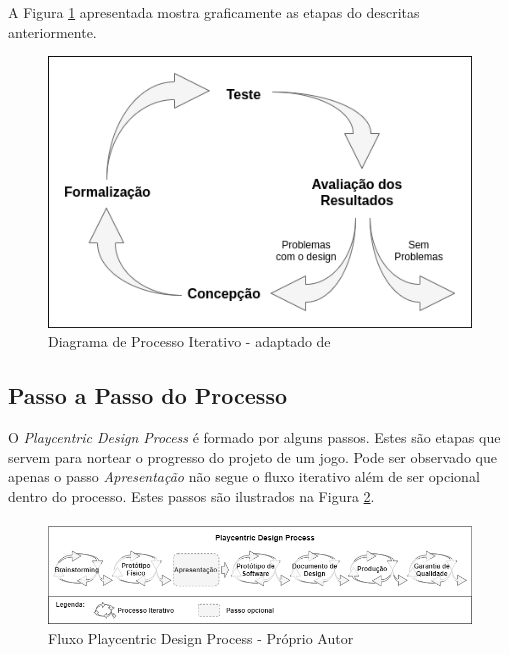  A Figura \ref{Fig:playcentric_process.png} apresentada mostra graficamente as etapas do descritas anteriormente.
 
\begin{figure}[htbp]
	\centering
		\includegraphics[keepaspectratio=true,scale=0.5]{figuras/playcentrtic_process.png}
	\caption{Diagrama de Processo Iterativo - adaptado de }
	\label{Fig:playcentric_process.png}
\end{figure}

\subsection{Passo a Passo do Processo}

O \textit{Playcentric Design Process} é formado por alguns passos. Estes são etapas que servem para nortear o progresso do projeto de um jogo. Pode ser observado que apenas o passo \textit{Apresentação} não segue o fluxo iterativo além de ser opcional dentro do processo. Estes passos são ilustrados na Figura \ref{Fig:playcentric.png}. 

\begin{figure}[htbp]
	\centering
		\includegraphics[keepaspectratio=true,scale=0.58]{figuras/playcentrtic.png}
	\caption{Fluxo Playcentric Design Process - Próprio Autor}
	\label{Fig:playcentric.png}
\end{figure}

